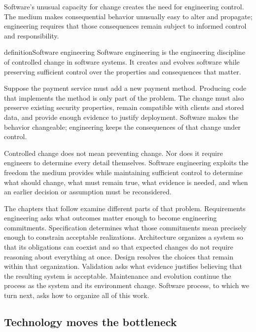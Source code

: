 Software's unusual capacity for change creates the need for engineering control. The medium makes
consequential behavior unusually easy to alter and propagate; engineering requires that those
consequences remain subject to informed control and responsibility.

\begin{bookbox}{definition}{Software engineering} %
Software engineering is the engineering discipline of controlled change in software systems. It creates
and evolves software while preserving sufficient control over the properties and consequences that
matter.

Suppose the payment service must add a new payment method. Producing code that implements the method is
only part of the problem. The change must also preserve existing security properties, remain compatible
with clients and stored data, and provide enough evidence to justify deployment. Software makes the
behavior changeable; engineering keeps the consequences of that change under control.
\end{bookbox}

Controlled change does not mean preventing change. Nor does it require engineers to determine every
detail themselves. Software engineering exploits the freedom the medium provides while maintaining
sufficient control to determine what should change, what must remain true, what evidence is needed, and
when an earlier decision or assumption must be reconsidered.

The chapters that follow examine different parts of that problem. Requirements engineering asks what
outcomes matter enough to become engineering commitments. Specification determines what those
commitments mean precisely enough to constrain acceptable realizations. Architecture organizes a system
so that its obligations can coexist and so that expected changes do not require reasoning about
everything at once. Design resolves the choices that remain within that organization. Validation asks
what evidence justifies believing that the resulting system is acceptable. Maintenance and evolution
continue the process as the system and its environment change. Software process, to which we turn next,
asks how to organize all of this work.

\subsection{Technology moves the bottleneck}\label{sec-bottleneck}

